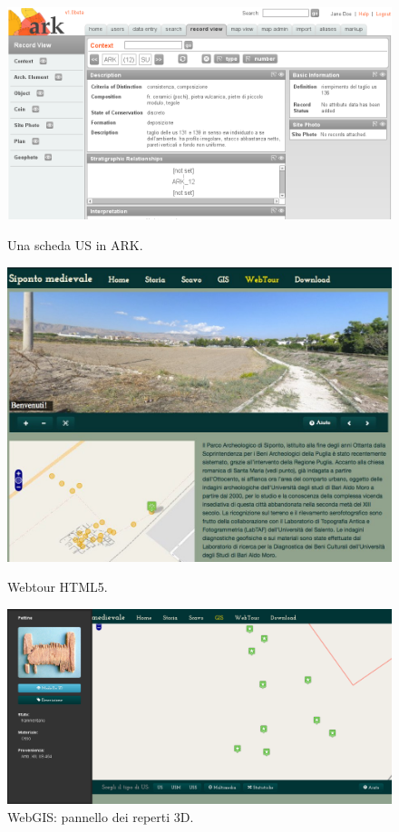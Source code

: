\documentclass[svgnames,portrait,final,usenames,dvipsnames]{baposter}
\begin{document}
\begin{poster}
{        \begin{figure}[H]
                \includegraphics[width=\linewidth]{ark}
                \caption[]{Una scheda US in ARK.}\label{fig:ark}
            \endminipage\hfill
                \includegraphics[width=\linewidth]{webtour}
                \caption[]{Webtour HTML5.}\label{fig:webtour}
            \endminipage\hfill
                \includegraphics[width=\linewidth]{gis}
                \caption[]{WebGIS: pannello dei reperti 3D.}\label{fig:gis}
            \endminipage\hfill
        \end{figure}

}
\end{poster}
\end{document}
